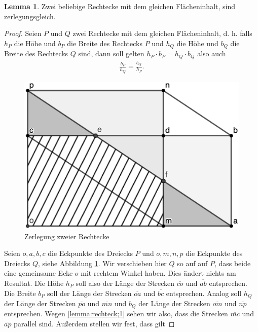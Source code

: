 \documentclass[11pt,titlepage]{article}
\theoremstyle{definition}
\newtheorem{lemma}[theorem]{Lemma}
\theoremstyle{remark}
\begin{document}
	\begin{lemma} \label{lemma:rechtecke}
		Zwei beliebige Rechtecke mit dem gleichen Flächeninhalt, sind zerlegungsgleich.
	\end{lemma}
	
	\begin{proof}
		Seien $P$ und $Q$ zwei Rechtecke mit dem gleichen Flächeninhalt, d. h. falls $h_P$ die Höhe und 
		$b_P$ die Breite des Rechtecks $P$ und $h_Q$ die Höhe und $b_Q$ die Breite des Rechtecks $Q$ sind, 
		dann soll gelten $h_P \cdot b_P = h_Q \cdot b_Q$ also auch
		\begin{align}
			\frac{b_P}{h_Q}=\frac{b_Q}{h_P}. \label{lemma:rechteck;1}
		\end{align}
		\begin{figure}[!htbp]
			\centering
			\includegraphics[scale=1.4]{Rechteck}
			\caption{Zerlegung zweier Rechtecke}
			\label{Abb.2}
		\end{figure}
		Seien $o,a,b,c$ die Eckpunkte des Dreiecks $P$ und $o,m,n,p$ die Eckpunkte des Dreiecks $Q$, siehe 
		Abbildung \ref{Abb.2}. 
		Wir verschieben hier $Q$ so auf auf $P$, dass beide eine gemeinsame Ecke $o$ mit rechtem Winkel haben. 
		Dies ändert nichts am Resultat. 
		Die Höhe $h_P$ soll also der Länge der Strecken $\overline{co}$ und $\overline{ab}$ entsprechen. Die 
		Breite $b_P$ soll der Länge der Strecken $\overline{oa}$ und $\overline{bc}$ entsprechen. Analog soll 
		$h_Q$ der Länge der Strecken $\overline{po}$ und $\overline{mn}$ und $b_Q$ der Länge der Strecken 
		$\overline{om}$ und $\overline{np}$ entsprechen. Wegen \ref{lemma:rechteck;1} sehen wir also, dass 
		die Strecken $\overline{mc}$ und $\overline{ap}$ parallel sind. Außerdem stellen wir fest, dass gilt

\end{proof}
\end{document}

